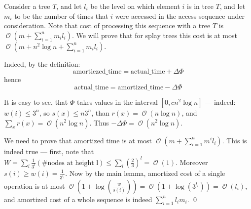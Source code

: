 \documentclass[11pt]{article}
\DeclareMathOperator*{\Oh}{\mathcal{O}}
\begin{document}
Consider a tree $T$, and let $l_i$ be the level on which element $i$ is in tree $T$, and let $m_i$ to be the number of times that $i$ were accessed in the access sequence under consideration.
Note that cost of processing this sequence with a tree $T$ is $\Oh(m + \sum_{i=1}^n m_i l_i)$. We will prove that for splay trees this cost is at most $\Oh(m + n^2 \log n + \sum_{i=1}^n m_i l_i)$.

Indeed, by the definition: 
\begin{equation*}
\mathrm{amortiezed\_time} = \mathrm{actual\_time} + \Delta\Phi
\end{equation*}
hence
\begin{equation*}
\mathrm{actual\_time} = \mathrm{amortized\_time} - \Delta\Phi
\end{equation*}

It is easy to see, that $\Phi$ takes values in the interval $[0, c n^2 \log n]$ --- indeed: $w(i) \leq 3^n$, so  $s(x) \leq n 3^n$, than $r(x) = \Oh(n \log n)$, and $\sum_x r(x) = \Oh(n^2 \log n)$. Thus $- \Delta\Phi = \Oh(n^2 \log n)$.

We need to prove that amortized time is at most $\Oh(m + \sum_{i=1}^n m^i l_i)$. This is indeed true --- first, note that $W = \sum_{l} \frac{1}{3^l} (\# \text{nodes at height l}) \leq \sum_{l} \left(\frac{2}{3}\right)^l = \Oh(1)$. Moreover $s(i) \geq w(i) = \frac{1}{3^{l_i}}$. Now by the main lemma, amortized cost of a single operation is at most $\Oh(1 + \log(\frac{w}{s(i)})) = \Oh(1 + \log(3^{l_i})) = \Oh(l_i)$, and amortized cost of a whole sequence is indeed $\sum_{i=1}^n l_i m_i$.
\qed

{}

\end{document}
